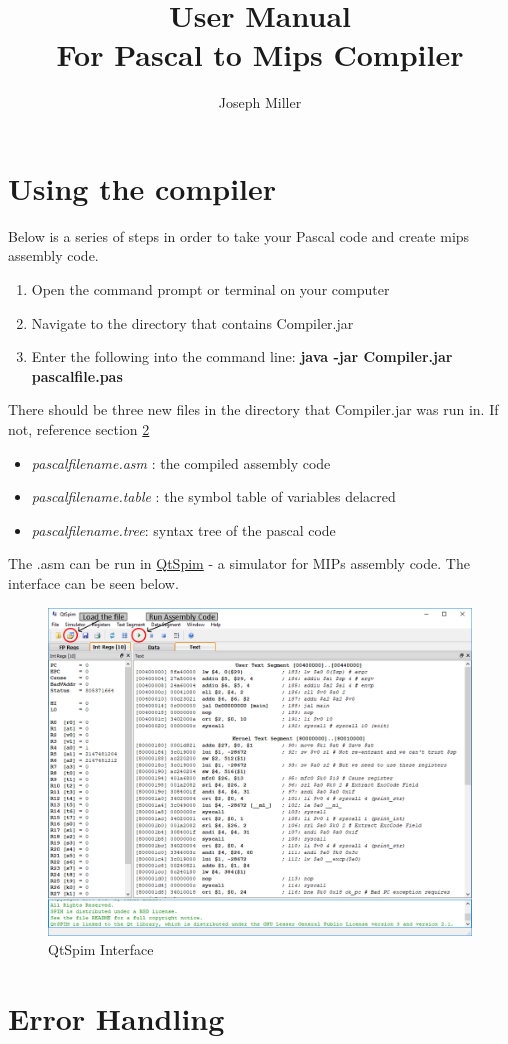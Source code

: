 \documentclass[english]{article}
\begin{document}
\title{ User Manual \\
	\large For Pascal to Mips Compiler}
\author{Joseph Miller}
\maketitle

\section{Using the compiler}

Below is a series of steps in order to take your Pascal code and create mips assembly code.

\begin{enumerate}
   \item Open the command prompt or terminal on your computer
   \item Navigate to the directory that contains Compiler.jar
   \item Enter the following into the command line: \textbf{java -jar Compiler.jar pascalfile.pas}
\end{enumerate}

\noindent There should be three new files in the directory that Compiler.jar was run in. If not, reference section \ref{errors}

\begin{itemize}
   \item  \textit{pascalfilename.asm} : the compiled assembly code
   \item  \textit{pascalfilename.table} : the symbol table of variables delacred
   \item  \textit{pascalfilename.tree}: syntax tree of the pascal code
\end{itemize}

\noindent The .asm can be run in \href{http://spimsimulator.sourceforge.net/}{QtSpim} - a simulator for MIPs assembly code. The interface can be seen below.

\begin{figure}[H]
\begin{center}
\includegraphics[width=.8\textwidth]{qtspim.PNG}
\end{center}
\caption{\label{QtSpim}QtSpim Interface}
\end{figure}


\section{Error Handling} \label{errors}
\end{document}
